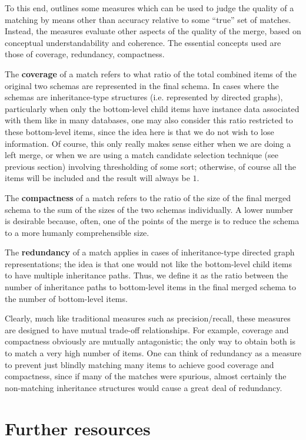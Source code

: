 \documentclass{datamade}
\theoremstyle{definition}
\theoremstyle{remark}
\begin{document}
To this end, \cite{comabenchmark} outlines some measures which can be used to judge the quality of a matching by means other than accuracy relative to some ``true'' set of matches. Instead, the measures evaluate other aspects of the quality of the merge, based on conceptual understandability and coherence. The essential concepts used are those of coverage, redundancy, compactness.

The \textbf{coverage} of a match refers to what ratio of the total combined items of the original two schemas are represented in the final schema. In cases where the schemas are inheritance-type structures (i.e. represented by directed graphs), particularly when only the bottom-level child items have instance data associated with them like in many databases, one may also consider this ratio restricted to these bottom-level items, since the idea here is that we do not wish to lose information. Of course, this only really makes sense either when we are doing a left merge, or when we are using a match candidate selection technique (see previous section) involving thresholding of some sort; otherwise, of course all the items will be included and the result will always be $1$.

The \textbf{compactness} of a match refers to the ratio of the size of the final merged schema to the sum of the sizes of the two schemas individually. A lower number is desirable because, often, one of the points of the merge is to reduce the schema to a more humanly comprehensible size.

The \textbf{redundancy} of a match applies in cases of inheritance-type directed graph representations; the idea is that one would not like the bottom-level child items to have multiple inheritance paths. Thus, we define it as the ratio between the number of inheritance paths to bottom-level items in the final merged schema to the number of bottom-level items.

Clearly, much like traditional measures such as precision/recall, these measures are designed to have mutual trade-off relationships. For example, coverage and compactness obviously are mutually antagonistic; the only way to obtain both is to match a very high number of items. One can think of redundancy as a measure to prevent just blindly matching many items to achieve good coverage and compactness, since if many of the matches were spurious, almost certainly the non-matching inheritance structures would cause a great deal of redundancy.

\section{Further resources}
\end{document}
